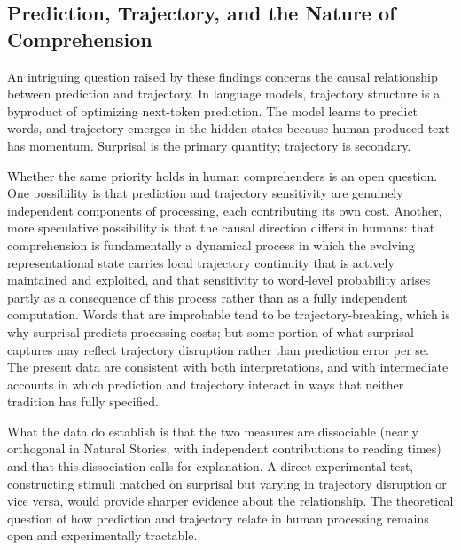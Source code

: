 \documentclass[12pt]{article}
\begin{document}
\subsection{Prediction, Trajectory, and the Nature of Comprehension}

An intriguing question raised by these findings concerns the causal relationship between prediction and trajectory. In language models, trajectory structure is a byproduct of optimizing next-token prediction. The model learns to predict words, and trajectory emerges in the hidden states because human-produced text has momentum. Surprisal is the primary quantity; trajectory is secondary.

Whether the same priority holds in human comprehenders is an open question. One possibility is that prediction and trajectory sensitivity are genuinely independent components of processing, each contributing its own cost. Another, more speculative possibility is that the causal direction differs in humans: that comprehension is fundamentally a dynamical process in which the evolving representational state carries local trajectory continuity that is actively maintained and exploited, and that sensitivity to word-level probability arises partly as a consequence of this process rather than as a fully independent computation. Words that are improbable tend to be trajectory-breaking, which is why surprisal predicts processing costs; but some portion of what surprisal captures may reflect trajectory disruption rather than prediction error per se. The present data are consistent with both interpretations, and with intermediate accounts in which prediction and trajectory interact in ways that neither tradition has fully specified.

What the data do establish is that the two measures are dissociable (nearly orthogonal in Natural Stories, with independent contributions to reading times) and that this dissociation calls for explanation. A direct experimental test, constructing stimuli matched on surprisal but varying in trajectory disruption or vice versa, would provide sharper evidence about the relationship. The theoretical question of how prediction and trajectory relate in human processing remains open and experimentally tractable.
\end{document}

